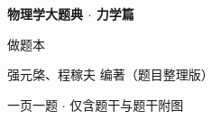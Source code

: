\documentclass[a4paper,11pt,oneside]{ctexbook}
\begin{document}
\begin{titlepage}
    \centering
    \vspace*{4cm}
    {\Huge\bfseries 物理学大题典 $\cdot$ 力学篇\par}
    \vspace{1cm}
    {\LARGE 做题本\par}
    \vspace{2cm}
    {\large 强元棨、程稼夫 编著（题目整理版）\par}
    \vfill
    {\normalsize 一页一题 $\cdot$ 仅含题干与题干附图\par}
\end{titlepage}

\tableofcontents
\clearpage













\end{document}
